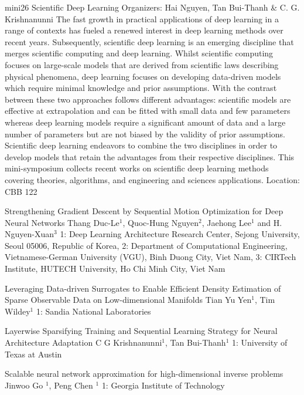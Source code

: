 \mini
{mini26}
{Scientific Deep Learning}
{Organizers: Hai Nguyen, Tan Bui-Thanh \& C. G. Krishnanunni}
{The fast growth in practical applications of deep learning in a range of contexts has fueled a renewed interest in deep learning methods over recent years. Subsequently, scientific deep learning is an emerging discipline that merges scientific computing and deep learning. Whilst scientific computing focuses on large-scale models that are derived from scientific laws describing physical phenomena, deep learning focuses on developing data-driven models which require minimal knowledge and prior assumptions. With the contrast between these two approaches follows different advantages: scientific models are effective at extrapolation and can be fitted with small data and few parameters whereas deep learning models require a significant amount of data and a large number of parameters but are not biased by the validity of prior assumptions. Scientific deep learning endeavors to combine the two disciplines in order to develop models that retain the advantages from their respective disciplines. This mini-symposium collects recent works on scientific deep learning methods covering theories, algorithms, and engineering and sciences applications.}
{Location: CBB 122}

\begin{talks}
\item\talk
{Strengthening Gradient Descent by Sequential Motion Optimization for Deep Neural Networks}
{Thang Duc-Le$^{1}$, Quoc-Hung Nguyen$^{2}$, Jaehong Lee$^{1}$ and H. Nguyen-Xuan$^{3}$}
{1:  Deep Learning Architecture Research Center, Sejong University, Seoul 05006, Republic of Korea, 2: Department of Computational Engineering, Vietnamese-German University (VGU), Binh Duong City, Viet Nam, 3: CIRTech Institute, HUTECH University, Ho Chi Minh City, Viet Nam}
\item\talk
{Leveraging Data-driven Surrogates to Enable Efficient Density Estimation of Sparse Observable Data on Low-dimensional Manifolds}
{Tian Yu Yen$^1$, Tim Wildey$^1$}
{1: Sandia National Laboratories}
\item\talk
{Layerwise Sparsifying Training and Sequential Learning Strategy for Neural Architecture Adaptation}
{C G Krishnanunni$^{1}$, Tan Bui-Thanh$^{1}$}
{1: University of Texas at Austin}
\item\talk
{Scalable neural network approximation for high-dimensional inverse problems}
{Jinwoo Go $^1$, Peng Chen $^1$}
{1: Georgia Institute of Technology}
\end{talks}
\room
